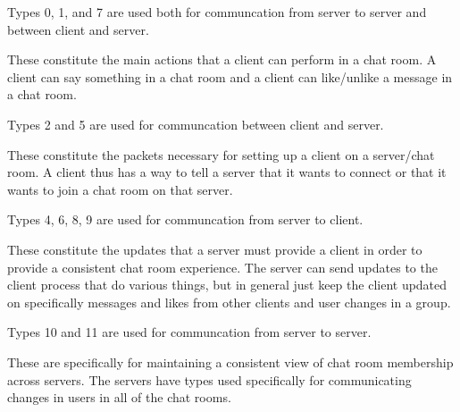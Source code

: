 \documentclass[12pt,journal,compsoc]{IEEEtran}
\begin{document}
Types 0, 1, and 7 are used both for communcation from server to server and between client and server.

These constitute the main actions that a client can perform in a chat room. A client can say something in a chat room and a client can like/unlike a message in a chat room.

Types 2 and 5 are used for communcation between client and server.

These constitute the packets necessary for setting up a client on a server/chat room. A client thus has a way to tell a server that it wants to connect or that it wants to join a chat room on that server.

Types 4, 6, 8, 9 are used for communcation from server to client.

These constitute the updates that a server must provide a client in order to provide a consistent chat room experience. The server can send updates to the client process that do various things, but in general just keep the client updated on specifically messages and likes from other clients and user changes in a group.

Types 10 and 11 are used for communcation from server to server.

These are specifically for maintaining a consistent view of chat room membership across servers. The servers have types used specifically for communicating changes in users in all of the chat rooms.

\newpage
\end{document}
